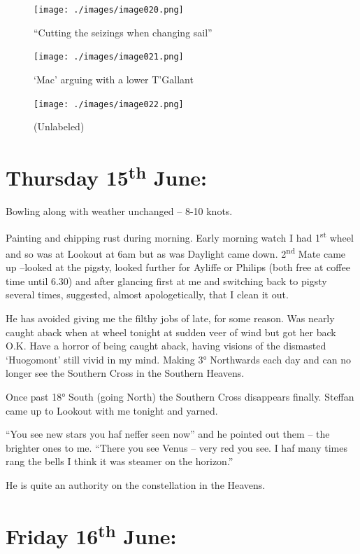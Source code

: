 \documentclass[
  11pt,
  msmallroyalvopaper
]{memoir}
\begin{document}
\begin{figure}
\centering
\texttt{[image: ./images/image020.png]}
\caption{``Cutting the seizings when changing sail''}
\end{figure}

\begin{figure}
\centering
\texttt{[image: ./images/image021.png]}
\caption{`Mac' arguing with a lower T'Gallant}
\end{figure}

\begin{figure}
\centering
\texttt{[image: ./images/image022.png]}
\caption{(Unlabeled)}
\end{figure}

\hypertarget{thursday-15th-june}{%
\section{\texorpdfstring{Thursday 15\textsuperscript{th}
June:}{Thursday 15th June:}}\label{thursday-15th-june}}

Bowling along with weather unchanged -- 8-10 knots.

Painting and chipping rust during morning. Early morning watch I had
1\textsuperscript{st} wheel and so was at Lookout at 6am but as was
Daylight came down. 2\textsuperscript{nd} Mate came up --looked at the
pigsty, looked further for Ayliffe or Philips (both free at coffee time
until 6.30) and after glancing first at me and switching back to pigsty
several times, suggested, almost apologetically, that I clean it out.

He has avoided giving me the filthy jobs of late, for some reason. Was
nearly caught aback when at wheel tonight at sudden veer of wind but got
her back O.K. Have a horror of being caught aback, having visions of the
dismasted `Huogomont' still vivid in my mind. Making 3° Northwards each
day and can no longer see the Southern Cross in the Southern Heavens.

Once past 18° South (going North) the Southern Cross disappears finally.
Steffan came up to Lookout with me tonight and yarned.

``You see new stars you haf neffer seen now'' and he pointed out them --
the brighter ones to me. ``There you see Venus -- very red you see. I
haf many times rang the bells I think it was steamer on the horizon.''

He is quite an authority on the constellation in the Heavens.

\hypertarget{friday-16th-june}{%
\section{\texorpdfstring{Friday 16\textsuperscript{th}
June:}{Friday 16th June:}}\label{friday-16th-june}}
\end{document}
